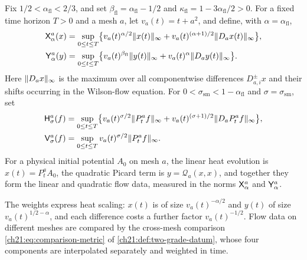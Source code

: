 \begin{definition}\label{ch01:def:enhancement}
Fix $1/2<\alpha_{\mathrm{fl}}<2/3$, and set $\beta_{\mathrm{fl}}=\alpha_{\mathrm{fl}}-1/2$ and $\kappa_{\mathrm{fl}}=1-3\alpha_{\mathrm{fl}}/2>0$. For a fixed time horizon $T>0$ and a mesh $a$, let $v_a(t)=t+a^2$, and define, with $\alpha=\alpha_{\mathrm{fl}}$,
\[
 \begin{split}
 \mathsf X_{\alpha}^{a}(x)&=\sup_{0\le t\le T}
  \bigl\{v_a(t)^{\alpha/2}\lVert x(t)\rVert_\infty
       +v_a(t)^{(\alpha+1)/2}\lVert D_ax(t)\rVert_\infty\bigr\},\\
 \mathsf Y_{\alpha}^{a}(y)&=\sup_{0\le t\le T}
  \bigl\{v_a(t)^{\beta_{\mathrm{fl}}}\lVert y(t)\rVert_\infty
       +v_a(t)^\alpha\lVert D_ay(t)\rVert_\infty\bigr\}.
 \end{split}
\]
Here $\lVert D_ax\rVert_\infty$ is the maximum over all componentwise differences $D^\pm_{a,i}x$ and their shifts occurring in the Wilson-flow equation. For $0<\sigma_{\mathrm{sm}}<1-\alpha_{\mathrm{fl}}$ and $\sigma=\sigma_{\mathrm{sm}}$, set
\[
 \begin{split}
 \mathsf H_{\sigma}^{a}(f)&=\sup_{0\le t\le T}
  \bigl\{v_a(t)^{\sigma/2}\lVert P_t^af\rVert_\infty
       +v_a(t)^{(\sigma+1)/2}\lVert D_aP_t^af\rVert_\infty\bigr\},\\
 \mathsf V_{\sigma}^{a}(f)&=\sup_{0\le t\le T}v_a(t)^{\sigma/2}\lVert P_t^af\rVert_\infty.
 \end{split}
\]
For a physical initial potential $A_0$ on mesh $a$, the linear heat evolution is $x(t)=P_t^aA_0$, the quadratic Picard term is $y=\mathcal Q_a(x,x)$, and together they form the linear and quadratic flow data, measured in the norms $\mathsf X_{\alpha}^{a}$ and $\mathsf Y_{\alpha}^{a}$.
\end{definition}

The weights express heat scaling: $x(t)$ is of size $v_a(t)^{-\alpha/2}$ and $y(t)$ of size $v_a(t)^{1/2-\alpha}$, and each difference costs a further factor $v_a(t)^{-1/2}$. Flow data on different meshes are compared by the cross-mesh comparison \eqref{ch21:eq:comparison-metric} of \cref{ch21:def:two-grade-datum}, whose four components are interpolated separately and weighted in time.

